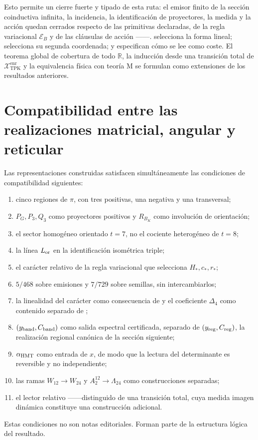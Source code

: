 Esto permite un cierre fuerte y tipado de esta ruta: el emisor finito de la
sección coinductiva infinita, la incidencia, la identificación de
proyectores, la medida y la acción quedan cerrados
respecto de las primitivas declaradas, de la regla variacional
\(\mathcal E_B\) y de las cláusulas de acción \HTr--\HAdd--\HDef--\HRes--\HLoc. \HAdd
selecciona la forma lineal; \HDef selecciona su segunda coordenada; \HRes y \HLoc
especifican cómo se lee como coste. El teorema global de
cobertura de todo \(\mathbb R\), la inducción desde una transición total de
\(\mathcal X_{\mathrm{TPK}}^{\mathrm{enr}}\) y la equivalencia física con
teoría M se formulan como extensiones de los resultados anteriores.

\section{Compatibilidad entre las realizaciones matricial, angular y reticular}

Las representaciones construidas satisfacen simultáneamente las condiciones
de compatibilidad siguientes:
\begin{enumerate}
  \item cinco regiones de \(\pi\), con tres positivas, una negativa y una
  transversal;
  \item \(P_G,P_3,Q_3\) como proyectores positivos y \(R_{B_K}\) como
  involución de orientación;
  \item el sector homogéneo orientado \(t=7\), no el cociente heterogéneo de \(t=8\);
  \item la línea \(L_{\rm or}\) en la identificación isométrica triple;
  \item el carácter relativo de la regla variacional que selecciona
  \(H_*,c_*,r_*\);
  \item \(5/468\) sobre emisiones y \(7/729\) sobre semillas, sin
  intercambiarlos;
  \item la linealidad del carácter como consecuencia de \HAdd y el coeficiente
  \(\Delta_4\) como contenido separado de \HDef;
  \item \((y_{\rm band},C_{\rm band})\) como salida espectral certificada,
  separado de \((y_{\rm reg},C_{\rm reg})\), la realización regional
  canónica de la sección siguiente;
  \item \(\alpha_{\rm HMT}\) como entrada de \(x\), de modo que la lectura
  del determinante es reversible y no independiente;
  \item las ramas \(W_{12}\to W_{24}\) y
  \(A_2^{12}\to\Lambda_{24}\) como construcciones separadas;
  \item el lector relativo \HTr--\HAdd--\HDef--\HRes--\HLoc distinguido de
  una transición total, cuya medida imagen dinámica constituye una
  construcción adicional.
\end{enumerate}

Estas condiciones no son notas editoriales. Forman parte de la estructura
lógica del resultado.
